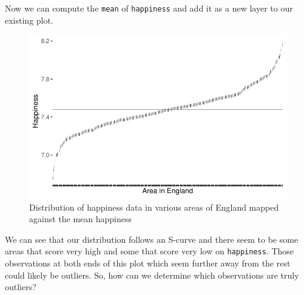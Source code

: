 \documentclass[
  letterpaper,
  DIV=11,
  numbers=noendperiod]{scrreprt}
\newenvironment{Shaded}{\begin{snugshade}}{\end{snugshade}}
\newcommand{\AttributeTok}[1]{\textcolor[rgb]{0.40,0.45,0.13}{#1}}
\newcommand{\CommentTok}[1]{\textcolor[rgb]{0.37,0.37,0.37}{#1}}
\newcommand{\ConstantTok}[1]{\textcolor[rgb]{0.56,0.35,0.01}{#1}}
\newcommand{\FunctionTok}[1]{\textcolor[rgb]{0.28,0.35,0.67}{#1}}
\newcommand{\NormalTok}[1]{\textcolor[rgb]{0.00,0.23,0.31}{#1}}
\newcommand{\OtherTok}[1]{\textcolor[rgb]{0.00,0.23,0.31}{#1}}
\newcommand{\SpecialCharTok}[1]{\textcolor[rgb]{0.37,0.37,0.37}{#1}}
\newcommand{\StringTok}[1]{\textcolor[rgb]{0.13,0.47,0.30}{#1}}
\begin{document}
Now we can compute the \texttt{mean} of \texttt{happiness} and add it as
a new layer to our existing plot.

\begin{Shaded}
\end{Shaded}

\begin{figure}[H]

{\centering \includegraphics{09_sources_of_bias_files/figure-latex/deviation-plot-with-mean-happiness-1.pdf}

}

\caption{Distribution of happiness data in various areas of England
mapped against the mean happiness}

\end{figure}%

We can see that our distribution follows an S-curve and there seem to be
some areas that score very high and some that score very low on
\texttt{happiness}. Those observations at both ends of this plot which
seem further away from the rest could likely be outliers. So, how can we
determine which observations are truly outliers?
\end{document}
